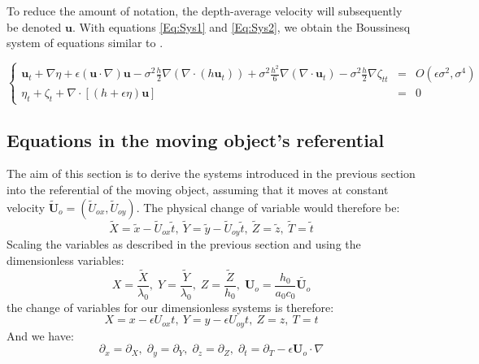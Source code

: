 \documentclass[11pt,a4paper]{article}
\begin{document}
			To reduce the amount of notation, the depth-average velocity will subsequently be denoted $\mathbf{u}$. With equations \eqref{Eq:Sys1} and \eqref{Eq:Sys2}, we obtain the Boussinesq system of equations similar to \cite{Peregrine}.
			\begin{center}
				$\left\lbrace
					\begin{array}{rll}
						\displaystyle \mathbf{u}_t + \nabla \eta + \epsilon (\mathbf{u} \cdot \nabla)\mathbf{u} - \sigma^2\frac{h}{2}\nabla (\nabla \cdot (h \mathbf{u}_t)) + \sigma^2 \frac{h^2}{6}\nabla (\nabla \cdot \mathbf{u}_t) - \sigma^2\frac{h}{2}\nabla \zeta_{tt}  & = & \displaystyle O(\epsilon \sigma^2, \sigma^4) \\
						\displaystyle \eta_t+\zeta_t + \nabla \cdot [(h+\epsilon\eta)\mathbf{u}] & = & 0
					\end{array}
				\right.$
			\end{center}
			
			\pagebreak
			
	\subsection{Equations in the moving object's referential}
	The aim of this section is to derive the systems introduced in the previous section into the referential of the moving object, assuming that it moves at constant velocity $\tilde{\mathbf{U}}_o = (\tilde{U}_{ox},\tilde{U}_{oy})$. The physical change of	variable would therefore be:
	\begin{equation*}
		\tilde{X} = \tilde{x} - \tilde{U}_{ox} \tilde t, \:
		\tilde{Y} = \tilde{y} - \tilde{U}_{oy} \tilde{t}, \:
		\tilde{Z} = \tilde{z}, \:
		\tilde{T} = \tilde{t}	
	\end{equation*}
	Scaling the variables as described in the previous section and using the dimensionless variables:
	\begin{equation*}
		X = \frac{\tilde{X}}{\lambda_0}, \;
		Y = \frac{\tilde{Y}}{\lambda_0}, \;
		Z = \frac{\tilde{Z}}{h_0}, \;
		\mathbf{U}_o = \frac{h_0}{a_0 c_0} \tilde{\mathbf{U}_o}
	\end{equation*}
	the change of variables for our dimensionless systems is therefore: 
	\begin{equation*}
		X = x - \epsilon U_{ox} t, \:
		Y = y - \epsilon U_{oy} t, \:
		Z = z, \:
		T = t	
	\end{equation*}
	And we have:
	\begin{equation}
		\partial_x = \partial_X, \;
		\partial_y = \partial_Y, \;
		\partial_z = \partial_Z, \;
		\partial_t = \partial_T - \epsilon \mathbf{U}_o \cdot \nabla \label{ChangeOfReferential}
	\end{equation}
	
\end{document}
